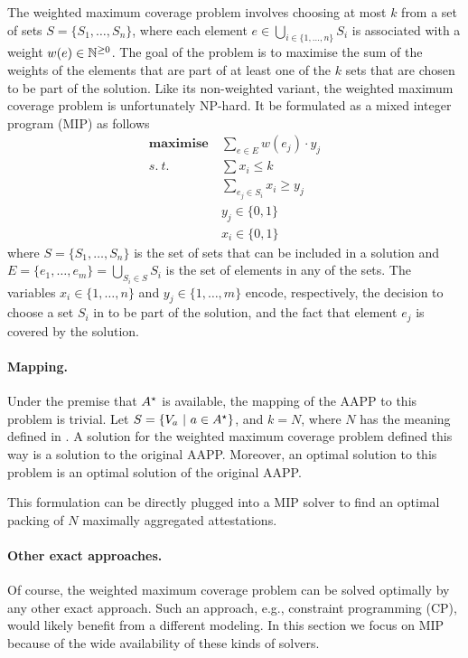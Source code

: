 \documentclass{article}
\begin{document}
The weighted maximum coverage problem involves choosing at most $k$ from a set
of sets $S = \{ S_1, \dots, S_n \}$, where each element $e \in \bigcup_{i \in
\{1, \dots, n\}} S_i$ is associated with a weight $w(e) \in
\mathbb{N}^{\geq 0}$. The goal of the problem is to maximise the sum of the
weights of the elements that are part of at least one of the $k$ sets that are
chosen to be part of the solution. Like its non-weighted variant, the weighted
maximum coverage problem is unfortunately NP-hard. It be formulated as a mixed
integer program (MIP) as follows
%
\begin{align}
  \mathbf{maximise}~  & \underset{e \in E}{\sum}w(e_j) \cdot y_j \\ \label{eq:cov}
  s.~t.~              & \sum x_i \leq k \\ \nonumber
                      & \underset{e_j \in S_i}{\sum}x_i \geq y_j \\ \nonumber
                      & y_j \in \{0, 1\}  \\ \nonumber
                      & x_i \in \{0, 1\} \nonumber
\end{align}
%
where $S = \{ S_1, \dots, S_n \}$ is the set of sets that can be included in a
solution and $E = \{ e_1, \dots, e_m \} = \bigcup_{S_i \in S} S_i$ is the set
of elements in any of the sets. The variables $x_i \in \{1, \dots, n\}$ and
$y_j \in \{1, \dots, m\}$ encode, respectively, the decision to choose a set
$S_i$ in to be part of the solution, and the fact that element $e_j$ is covered
by the solution.

\paragraph{Mapping.}Under the premise that $A^{\star}$ is
available, the mapping of the AAPP to this problem is trivial. Let $S = \{
V_{a}~|~a \in A^{\star} \}$, and $k = N$, where $N$ has the
meaning defined in \cite{Satalia22a}. A solution for the weighted maximum
coverage problem defined this way is a solution to the original AAPP.
Moreover, an optimal solution to this problem is an optimal solution of the
original AAPP.

This formulation can be directly plugged into a MIP solver to find an optimal
packing of $N$ maximally aggregated attestations. 

\paragraph{Other exact approaches.}Of course, the weighted maximum coverage
problem can be solved optimally by any other exact approach. Such an approach,
e.g., constraint programming (CP), would likely benefit from a different
modeling. In this section we focus on MIP because of the wide availability of
these kinds of solvers.
\end{document}
